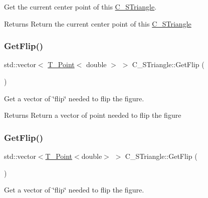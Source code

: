 Get the current center point of this \hyperlink{classC__STriangle}{C\+\_\+\+S\+Triangle}. 

\begin{DoxyReturn}{Returns}
Return the current center point of this \hyperlink{classC__STriangle}{C\+\_\+\+S\+Triangle} 
\end{DoxyReturn}
\mbox{\label{classC__STriangle_a92550826ba2d9866f2cb01b66abfbebc}} 
\subsubsection{\texorpdfstring{Get\+Flip()}{GetFlip()}\hspace{0.1cm}{\footnotesize\ttfamily [1/2]}}
{\footnotesize\ttfamily std\+::vector$<$ \hyperlink{classT__Point}{T\+\_\+\+Point}$<$ double $>$ $>$ C\+\_\+\+S\+Triangle\+::\+Get\+Flip (\begin{DoxyParamCaption}{ }\end{DoxyParamCaption})}



Get a vector of \char`\"{}flip\char`\"{} needed to flip the figure. 

\begin{DoxyReturn}{Returns}
Return a vector of point needed to flip the figure 
\end{DoxyReturn}
\mbox{\label{classC__STriangle_afdeec8c3851ebc3d7fe21a77e8768bfa}} 
\subsubsection{\texorpdfstring{Get\+Flip()}{GetFlip()}\hspace{0.1cm}{\footnotesize\ttfamily [2/2]}}
{\footnotesize\ttfamily std\+::vector$<$\hyperlink{classT__Point}{T\+\_\+\+Point}$<$double$>$ $>$ C\+\_\+\+S\+Triangle\+::\+Get\+Flip (\begin{DoxyParamCaption}{ }\end{DoxyParamCaption})}



Get a vector of \char`\"{}flip\char`\"{} needed to flip the figure. 

